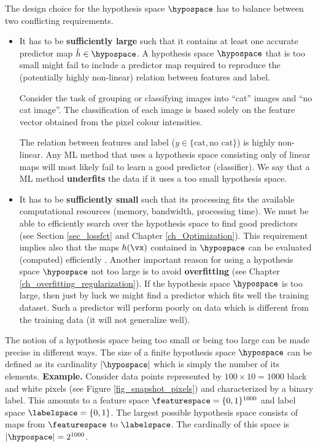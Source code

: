 \documentclass[12pt]{report}
\begin{document}
The design choice for the hypothesis space $\hypospace$ 
has to balance between two conflicting requirements.  
\begin{itemize} 
\item It has to be {\bf sufficiently large} such that it contains at least 
one accurate predictor map $\hat{h} \in \hypospace$. A hypothesis 
space $\hypospace$ that is too small might fail to include a predictor 
map required to reproduce the (potentially highly non-linear) relation 
between features and label. 

Consider the task of grouping or classifying images into 
``cat'' images and ``no cat image''. The classification of 
each image is based solely on the feature vector obtained 
from the pixel colour intensities. 

The relation between features and label ($y \in \{ \mbox{cat}, \mbox{no cat} \}$) 
is highly non-linear. Any ML method that uses a hypothesis space 
consisting only of linear maps will most likely fail to 
learn a good predictor (classifier). We say that a ML 
method {\bf underfits} the data if it uses a too small 
hypothesis space. 
\item It has to be {\bf sufficiently small} such that its processing fits the 
available computational resources (memory, bandwidth, processing time). 
We must be able to efficiently search over the hypothesis space to find 
good predictors (see Section \ref{sec_lossfct} and Chapter \ref{ch_Optimization}). 
This requirement implies also that the maps $h(\vx)$ contained in $\hypospace$ 
can be evaluated (computed) efficiently \cite{Austin2018}. Another important 
reason for using a hypothesis space $\hypospace$ not too large is to 
avoid {\bf overfitting} (see Chapter \ref{ch_overfitting_regularization}). 
If the hypothesis space $\hypospace$ is too large, then just by luck we 
might find a predictor which fits well the training dataset. Such a predictor 
will perform poorly on data which is different from the training data 
(it will not generalize well). 
\end{itemize}

The notion of a hypothesis space being too small or being 
too large can be made precise in different ways. The size of 
a finite hypothesis space $\hypospace$ can be defined as 
its cardinality $|\hypospace|$ which is simply the number of 
its elements. 
{\bf Example.} Consider data points represented by $100 \times 10\!=\!1000$ 
black and white pixels (see Figure \ref{fig_snapshot_pixels}) and 
characterized by a binary label. This amounts to a feature space 
$\featurespace = \{0,1\}^{1000}$ and label space $\labelspace = \{0,1\}$. 
The largest possible hypothesis space consists of maps from 
$\featurespace$ to $\labelspace$. The cardinally of this space is 
$|\hypospace| = 2^{1000}$.
\end{document}
